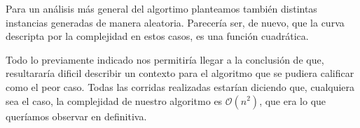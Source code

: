 Para un análisis más general del algortimo planteamos también distintas instancias generadas de manera aleatoria. Parecería ser, de nuevo, que la curva descripta por la complejidad en estos casos, es una función cuadrática.

Todo lo previamente indicado nos permitiría llegar a la conclusión de que, resultararía dificil describir un contexto para el algoritmo que se pudiera calificar como el peor caso. Todas las corridas realizadas estarían diciendo que, cualquiera sea el caso, la complejidad de nuestro algoritmo es $\mathcal{O}(n^2)$, que era lo que queríamos observar en definitiva.  

\vspace*{0.6cm}


